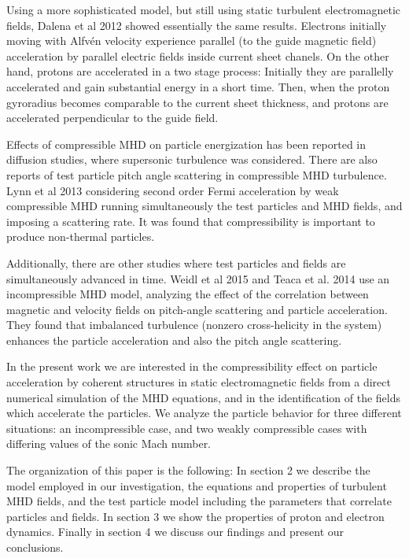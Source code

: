 \documentclass[%
aip,pop,amsmath,amssymb,
 reprint,%
]{revtex4-1}
\begin{document}
Using a more sophisticated model, but still using static turbulent 
electromagnetic fields, Dalena et al 2012\cite{Dalena2012} showed essentially the same 
results. Electrons initially moving with Alfv\'en velocity experience parallel 
(to the guide magnetic field) acceleration by parallel electric fields inside current 
sheet chanels. On the other hand, protons are accelerated in a two stage process: 
Initially they are parallelly accelerated and gain substantial energy in a short time. Then,
when the proton gyroradius becomes comparable to the current sheet thickness, and protons are 
accelerated perpendicular to the guide field.  


Effects of compressible MHD on particle energization has been reported 
in diffusion studies\cite{Chandran2003,CHO1}, where supersonic
turbulence was considered. There are also reports of test particle pitch angle scattering in 
compressible MHD turbulence. Lynn et al 2013\cite{Lynn2013} considering 
second order Fermi acceleration by weak compressible MHD running simultaneously
the test particles and MHD fields, and imposing a scattering rate.
It was found that compressibility is important to produce non-thermal particles. 

Additionally, there are other
studies where test particles and fields are simultaneously advanced in time.
Weidl et al 2015\cite{Weidl2015} and Teaca et al. 2014\cite{Bogdan2014} 
use an incompressible MHD model, analyzing the effect of the 
correlation between magnetic and velocity fields 
on pitch-angle scattering and particle 
acceleration. They found that imbalanced turbulence (nonzero cross-helicity in 
the system) enhances the particle acceleration and also 
the pitch angle scattering.


In the present work we are interested in the compressibility effect 
on particle acceleration by coherent structures in static electromagnetic fields 
from a direct numerical simulation of the MHD equations, and in the identification
of the fields which accelerate the particles. We analyze the particle behavior for three 
different situations: an incompressible case, and two weakly compressible cases with 
differing values of the sonic Mach number. 

The organization of this paper is the following:  In section 2  
we describe the model employed in our investigation, the equations and properties of 
turbulent MHD fields, and the test particle model including the parameters that correlate 
particles and fields. In section 3 we show the properties of proton and electron dynamics. 
Finally in section 4 we discuss our findings and present our conclusions.
\end{document}
